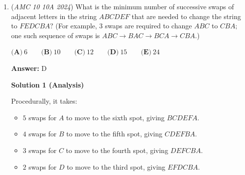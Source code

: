 \begin{enumerate}
 Memorizing the prime factorization of the current year is useful for the AMC 8/10/12 Exams.

 <u>\textbf{Remark}</u>

 Note that $2024$ is $2025 -1$, which is $45^2 -1 = (45+1)(45-1) = 46 \cdot 44 = 2^3 \cdot 11 \cdot 23$.

 <u>\textbf{Remark}</u>

 Another way to check if you don't remember the prime factorization is to factor to the best of your ability and then check the answer choices for another factor. In this case, $2024 = 253 \cdot 2^3$, then check the answer choice for anything that can be multiplied out, $253 = 11 \cdot 23$, so $2024 = 11 \cdot 23 \cdot 2^3$.

 


	\item (\textit{AMC 10 10A 2024}) What is the minimum number of successive swaps of adjacent letters in the string $ABCDEF$ that are needed to change the string to $FEDCBA?$ (For example, $3$ swaps are required to change $ABC$ to $CBA;$ one such sequence of swaps is
$ABC\to BAC\to BCA\to CBA.$)


 $\textbf{(A)}~6\qquad\textbf{(B)}~10\qquad\textbf{(C)}~12\qquad\textbf{(D)}~15\qquad\textbf{(E)}~24$

 \textbf{Answer: }D



\textbf{Solution 1 (Analysis)}

Procedurally, it takes:

 
            \begin{itemize}
        \item $5$ swaps for $A$ to move to the sixth spot, giving $BCDEFA.$
            \end{itemize}
            
            \begin{itemize}
        \item $4$ swaps for $B$ to move to the fifth spot, giving $CDEFBA.$
            \end{itemize}
            
            \begin{itemize}
        \item $3$ swaps for $C$ to move to the fourth spot, giving $DEFCBA.$
            \end{itemize}
            
            \begin{itemize}
        \item $2$ swaps for $D$ to move to the third spot, giving $EFDCBA.$
            \end{itemize}
            

\end{enumerate}

